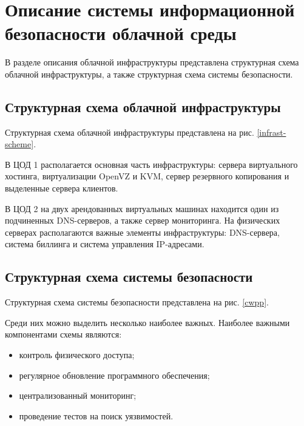 \section{Описание системы информационной безопасности облачной среды}

В разделе описания облачной инфраструктуры представлена структурная схема облачной инфраструктуры, а также структурная схема системы безопасности.

\subsection{Структурная схема облачной инфраструктуры}

Структурная схема облачной инфраструктуры представлена на рис. \ref{infrast-scheme}.


В ЦОД 1 располагается основная часть инфраструктуры: сервера виртуального хостинга, виртуализации OpenVZ и KVM, сервер резервного копирования и выделенные сервера клиентов.

В ЦОД 2 на двух арендованных виртуальных машинах находится один из подчиненных DNS-серверов, а также сервер мониторинга.
На физических серверах располагаются важные элементы инфраструктуры: DNS-сервера, система биллинга и система управления IP-адресами.

\subsection{Структурная схема системы безопасности}

Структурная схема системы безопасности представлена на рис. \ref{cwpp}.


Среди них можно выделить несколько наиболее важных.
Наиболее важными компонентами схемы являются:
\begin{itemize}
  \item контроль физического доступа;
  \item регулярное обновление программного обеспечения;
  \item централизованный мониторинг;
  \item проведение тестов на поиск уязвимостей.
\end{itemize}

\clearpage